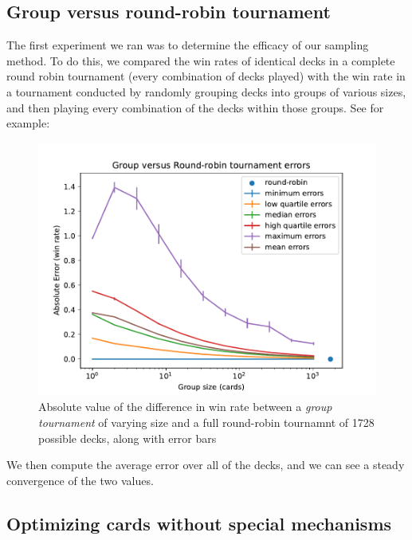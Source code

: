\subsection{Group versus round-robin tournament}

The first experiment we ran was to determine the efficacy of our sampling method. To do this, we compared the win rates of identical decks in a complete round robin tournament (every combination of decks played) with the win rate in a tournament conducted by randomly grouping decks into groups of various sizes, and then playing every combination of the decks within those groups. See for example:

\begin{figure}[t]
	\centering
	\includegraphics[width=0.9\columnwidth]{group_vs_rr_fig}
	\caption{Absolute value of the difference in win rate between a \textit{group tournament} of varying size and a full round-robin tournamnt of 1728 possible decks, along with error bars}
	\label{fig:group_vs_rr}
\end{figure}


We then compute the average error over all of the decks, and we can see a steady convergence of the two values.


 \subsection{Optimizing cards without special mechanisms}

